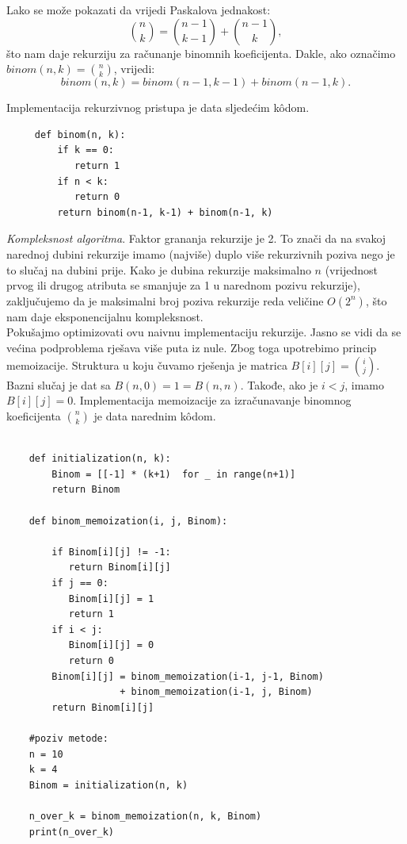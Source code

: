   Lako se može pokazati da vrijedi Paskalova jednakost:
  $$ \binom{n}{k} = \binom{n-1}{k-1} + \binom{n-1}{k},$$
   što nam daje rekurziju za računanje binomnih koeficijenta. Dakle, ako označimo $binom(n, k) = \binom{n}{k}$, vrijedi:
   $$ binom(n, k)= binom(n-1, k-1) + binom(n-1, k).$$
   
   Implementacija rekurzivnog pristupa je data sljedećim k\^odom.
   
   \begin{verbatim}
     def binom(n, k): 
         if k == 0:
            return 1
         if n < k:
            return 0
         return binom(n-1, k-1) + binom(n-1, k)
   \end{verbatim}
  \textit{Kompleksnost algoritma}. Faktor grananja rekurzije je 2. To znači da na svakoj narednoj dubini rekurzije imamo (najviše) duplo više rekurzivnih poziva nego je to slučaj na dubini prije.  Kako je dubina rekurzije maksimalno $n$ (vrijednost prvog ili drugog atributa se smanjuje za 1 u narednom pozivu rekurzije), zaključujemo da je maksimalni broj poziva rekurzije reda veličine $O(2^n)$, što nam daje eksponencijalnu kompleksnost. \\
  
  Pokušajmo optimizovati ovu naivnu implementaciju rekurzije.  Jasno se vidi da se većina podproblema rješava više puta iz nule. Zbog toga upotrebimo princip memoizacije. Struktura u koju čuvamo rješenja je matrica $B[i][j]= \binom{i}{j}$. Bazni slučaj je  dat sa $B(n, 0) = 1 = B(n,n)$. Takođe, ako je $i < j$, imamo $B[i][j] = 0$. Implementacija memoizacije za izračunavanje binomnog koeficijenta $\binom{n}{k}$ je data narednim k\^odom. 
  
  \begin{verbatim}
  	
  	def initialization(n, k):
  	    Binom = [[-1] * (k+1)  for _ in range(n+1)] 
  	    return Binom 
  	    
  	def binom_memoization(i, j, Binom): 
  	    
  	    if Binom[i][j] != -1:
  	       return Binom[i][j] 
  	    if j == 0: 
  	       Binom[i][j] = 1
  	       return 1 
  	    if i < j: 
  	       Binom[i][j] = 0 
  	       return 0
  	    Binom[i][j] = binom_memoization(i-1, j-1, Binom) 
  	                + binom_memoization(i-1, j, Binom) 
  	    return Binom[i][j]

    #poziv metode:
    n = 10
    k = 4
    Binom = initialization(n, k) 
    
    n_over_k = binom_memoization(n, k, Binom) 
    print(n_over_k)
    
  \end{verbatim}  
  
